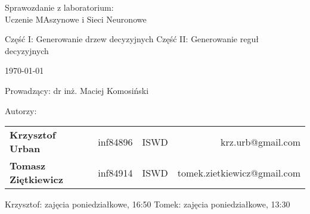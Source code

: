 \thispagestyle{empty} %

\begin{center}
{\large{Sprawozdanie z laboratorium:\\
Uczenie MAszynowe i Sieci Neuronowe}}

\vspace{3ex}

Część I: Generowanie drzew decyzyjnych
Część II: Generowanie reguł decyzyjnych


\vspace{3ex}
{\footnotesize\today}

\end{center}


\vspace{10ex}

Prowadzący: dr inż. Maciej Komosiński

\vspace{5ex}

Autorzy:
\begin{tabular}{lllr}
\textbf{Krzysztof Urban} & inf84896 & ISWD & krz.urb@gmail.com \\
\textbf{Tomasz Ziętkiewicz} & inf84914 & ISWD & tomek.zietkiewicz@gmail.com \\
\end{tabular}

\vspace{5ex}

Krzysztof: zajęcia poniedziałkowe, 16:50
Tomek: zajęcia poniedziałkowe, 13:30


\newpage

